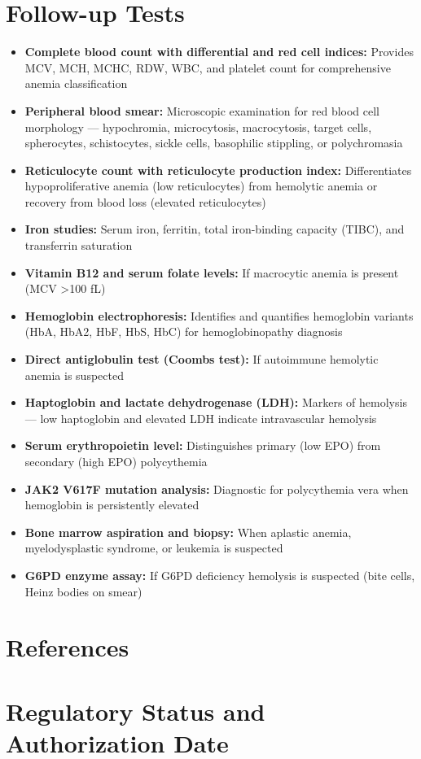 \section*{Follow-up Tests}
\begin{itemize}
  \item \textbf{Complete blood count with differential and red cell indices:} Provides MCV, MCH, MCHC, RDW, WBC, and platelet count for comprehensive anemia classification
  \item \textbf{Peripheral blood smear:} Microscopic examination for red blood cell morphology --- hypochromia, microcytosis, macrocytosis, target cells, spherocytes, schistocytes, sickle cells, basophilic stippling, or polychromasia
  \item \textbf{Reticulocyte count with reticulocyte production index:} Differentiates hypoproliferative anemia (low reticulocytes) from hemolytic anemia or recovery from blood loss (elevated reticulocytes)
  \item \textbf{Iron studies:} Serum iron, ferritin, total iron-binding capacity (TIBC), and transferrin saturation
  \item \textbf{Vitamin B12 and serum folate levels:} If macrocytic anemia is present (MCV >100 fL)
  \item \textbf{Hemoglobin electrophoresis:} Identifies and quantifies hemoglobin variants (HbA, HbA2, HbF, HbS, HbC) for hemoglobinopathy diagnosis
  \item \textbf{Direct antiglobulin test (Coombs test):} If autoimmune hemolytic anemia is suspected
  \item \textbf{Haptoglobin and lactate dehydrogenase (LDH):} Markers of hemolysis --- low haptoglobin and elevated LDH indicate intravascular hemolysis
  \item \textbf{Serum erythropoietin level:} Distinguishes primary (low EPO) from secondary (high EPO) polycythemia
  \item \textbf{JAK2 V617F mutation analysis:} Diagnostic for polycythemia vera when hemoglobin is persistently elevated
  \item \textbf{Bone marrow aspiration and biopsy:} When aplastic anemia, myelodysplastic syndrome, or leukemia is suspected
  \item \textbf{G6PD enzyme assay:} If G6PD deficiency hemolysis is suspected (bite cells, Heinz bodies on smear)
\end{itemize}

\section*{References}



\clearpage
\section*{Regulatory Status and Authorization Date}

\clearpage
